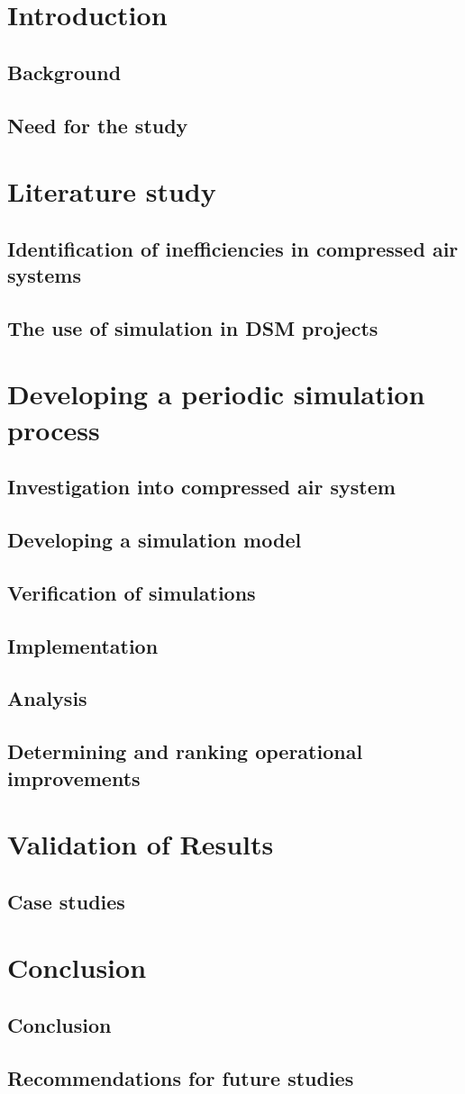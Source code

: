 \documentclass[12pt, english, oneside, singlespacing, open=any]{report}
\begin{document}
 
 
\tableofcontents
 
\chapter{Introduction}
 \section{Background}
 \section{Need for the study}
 
\chapter{Literature study}
\section{Identification of inefficiencies in compressed air systems}
\section{The use of simulation in DSM projects}
\chapter{Developing a periodic simulation process}
\section{Investigation into compressed air system}
\section{Developing a simulation model}
\section{Verification of simulations}
\section{Implementation}
\section{Analysis}
\section{Determining and ranking operational improvements}
\chapter{Validation of Results}
\section{Case studies}
 \chapter{Conclusion}
 \section{Conclusion}
 \section{Recommendations for future studies}
\end{document}
